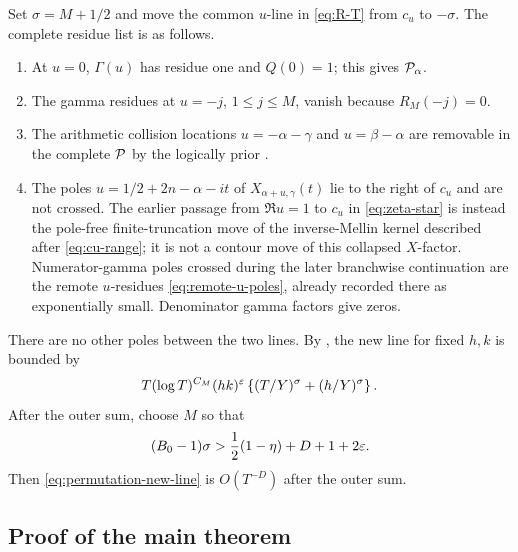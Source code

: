 Set $\sigma=M+1/2$ and move the common $u$-line in
\eqref{eq:R-T} from $c_u$ to $-\sigma$.  The complete residue list is as
follows.
\begin{enumerate}[label=\textup{(\roman*)},leftmargin=8mm]
\item At $u=0$, $\Gamma(u)$ has residue one and $Q(0)=1$; this gives
$\mathcal P_\alpha$.
\item The gamma residues at $u=-j$, $1\leq j\leq M$, vanish because
$R_M(-j)=0$.
\item The arithmetic collision locations $u=-\alpha-\gamma$ and
$u=\beta-\alpha$ are removable in the complete $\mathcal P$ by
the logically prior .
\item The poles $u=1/2+2n-\alpha-it$ of
$X_{\alpha+u,\gamma}(t)$ lie to the right of $c_u$ and are not crossed.
The earlier passage from $\Re u=1$ to $c_u$ in
\eqref{eq:zeta-star} is instead the pole-free finite-truncation move of the
inverse-Mellin kernel described after \eqref{eq:cu-range}; it is not a contour
move of this collapsed $X$-factor.  Numerator-gamma poles crossed during the
later branchwise continuation are the remote $u$-residues
\eqref{eq:remote-u-poles}, already recorded there as exponentially small.
Denominator gamma factors give zeros.
\end{enumerate}
There are no other poles between the two lines.  By
, the new line for fixed $h,k$ is bounded by
\begin{equation}\label{eq:permutation-new-line}
 T(\log T)^{C_M}(hk)^\varepsilon
 \left\{(T/Y)^\sigma+(h/Y)^\sigma\right\}.
\end{equation}
After the outer sum, choose $M$ so that
\begin{equation}\label{eq:M-choice}
 (B_0-1)\sigma>\frac12(1-\eta)+D+1+2\varepsilon.
\end{equation}
Then \eqref{eq:permutation-new-line} is $O(T^{-D})$ after the outer sum.

\subsection{Proof of the main theorem}

